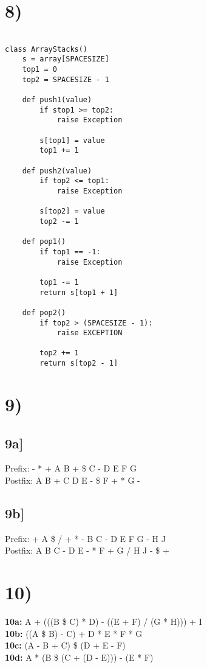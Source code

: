 \documentclass[a4paper,11pt]{article}
\begin{document}
\section*{8)}
\begin{verbatim}

class ArrayStacks()
    s = array[SPACESIZE]
    top1 = 0
    top2 = SPACESIZE - 1
    
    def push1(value)
        if stop1 >= top2:
            raise Exception
            
        s[top1] = value
        top1 += 1
    
    def push2(value)
        if top2 <= top1:
            raise Exception
            
        s[top2] = value
        top2 -= 1
        
    def pop1()
        if top1 == -1:
            raise Exception
            
        top1 -= 1
        return s[top1 + 1]

    def pop2()
        if top2 > (SPACESIZE - 1):
            raise EXCEPTION
            
        top2 += 1
        return s[top2 - 1]

\end{verbatim}


\section*{9)}
\subsection*{9a]}
Prefix: - * + A B + \$ C - D E F G         \\
Postfix:  A B + C D E - \$ F + * G -      
\subsection*{9b]}
Prefix:  + A \$ / + * - B C - D E F G - H J     \\
Postfix: A B C - D E - * F + G /  H J - \$ + 


\section*{10)}
{\bf 10a:} A + (((B \$ C) * D) - ((E + F) / (G * H))) + I     \\
{\bf 10b:} ((A \$ B) - C) + D * E * F * G            \\
{\bf 10c:} (A - B + C) \$ (D + E - F)            \\
{\bf 10d:} A * (B \$ (C + (D - E))) - (E * F)
\end{document}

